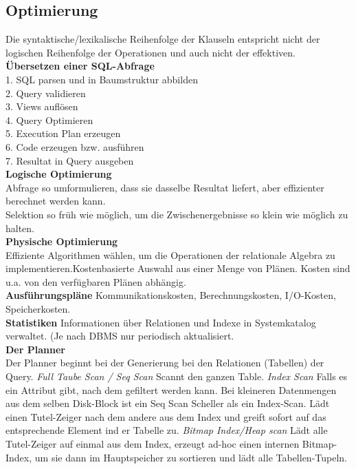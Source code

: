 \documentclass[7pt,landscape,a4paper]{scrartcl}
\begin{document}
\begin{multicols*}{4}
\subsection{Optimierung}
Die syntaktische/lexikalische Reihenfolge der Klauseln entspricht nicht der logischen Reihenfolge der Operationen und auch nicht der effektiven.\\
\textbf{Übersetzen einer SQL-Abfrage}\\
1. SQL parsen und in Baumstruktur abbilden\\
2. Query validieren\\
3. Views auflösen\\
4. Query Optimieren\\
5. Execution Plan erzeugen\\
6. Code erzeugen bzw. ausführen\\
7. Resultat in Query ausgeben\\ 
\textbf{Logische Optimierung}\\
Abfrage so umformulieren, dass sie dasselbe Resultat liefert, aber effizienter berechnet werden kann.\\
Selektion so früh wie möglich, um die Zwischenergebnisse so klein wie möglich zu halten. \\
\textbf{Physische Optimierung}\\
Effiziente Algorithmen wählen, um die Operationen der relationale Algebra zu implementieren.Kostenbasierte Auswahl aus einer Menge von Plänen.
Kosten sind u.a. von den verfügbaren Plänen abhängig. \\
\textbf{Ausführungspläne} Kommunikationskosten, Berechnungskosten, I/O-Kosten, Speicherkosten.\\
\textbf{Statistiken} Informationen über Relationen und Indexe in Systemkatalog verwaltet. (Je nach DBMS nur periodisch aktualisiert.\\
\textbf{Der Planner}\\
Der Planner beginnt bei der Generierung bei den Relationen (Tabellen) der Query. \textit{Full Taube Scan / Seq Scan} Scannt den ganzen Table. \textit{Index Scan} Falls es ein Attribut gibt, nach dem gefiltert werden kann.  Bei kleineren Datenmengen aus dem selben Disk-Block ist ein Seq Scan Scheller als ein Index-Scan. Lädt einen Tutel-Zeiger nach dem andere aus dem Index und greift sofort auf das entsprechende Element ind er Tabelle zu. \textit{Bitmap Index/Heap scan} Lädt alle Tutel-Zeiger auf einmal aus dem Index, erzeugt ad-hoc einen internen Bitmap-Index, um sie dann im Hauptspeicher zu sortieren und lädt alle Tabellen-Tupeln.\\

\end{multicols*}
\end{document}
